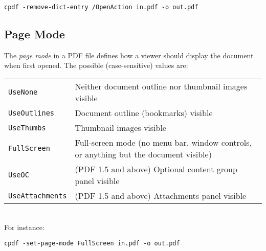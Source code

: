 \documentclass{book}
\begin{document}
  \begin{framed}
    \small\verb!cpdf -remove-dict-entry /OpenAction in.pdf -o out.pdf!
  \end{framed}

  \subsection{Page Mode}
  The \textit{page mode} in a PDF file defines how a viewer should display the
document when first opened. The possible (case-sensitive) values are:

\vspace{2mm}
  {\small\begin{tabular}{ll}
    \texttt{UseNone} & \vspace{2mm} \parbox{8cm}{Neither document outline nor thumbnail images visible} \\
    \texttt{UseOutlines} & \vspace{2mm} \parbox{8cm}{Document outline (bookmarks) visible} \\
    \texttt{UseThumbs} & \vspace{2mm} \parbox{8cm}{Thumbnail images visible} \\
    \texttt{FullScreen} & \vspace{2mm} \parbox{8cm}{Full-screen mode (no menu bar, window controls, or anything but the document visible)} \\
    \texttt{UseOC} & \vspace{2mm} \parbox{8cm}{(PDF 1.5 and above) Optional content group panel visible} \\
    \texttt{UseAttachments} & \vspace{2mm} \parbox{8cm}{(PDF 1.5 and above) Attachments panel visible}
  \end{tabular}}\\

  \noindent For instance:
  \begin{framed}
    \small\verb!cpdf -set-page-mode FullScreen in.pdf -o out.pdf!
  \end{framed}
  
\end{document}
